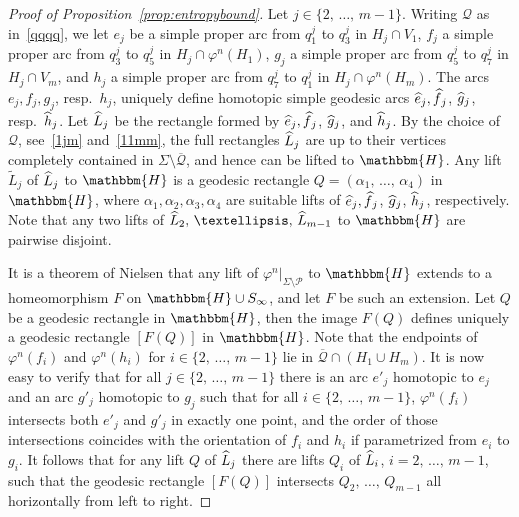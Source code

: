 \documentclass[10pt,a4paper]{amsart}
\numberwithin{equation}{section}
\newcommand{\Hy}{\mathbbm{H}}
\newcommand{\clP}{\mathcal{P}}
\newcommand{\clQ}{\mathcal{Q}}
\let\oldhat\hat
\renewcommand*{\hat}[1]{\mathchoice{\widehat{#1}}{\widehat{#1}}{\oldhat{#1}}{\oldhat{#1}}}
\theoremstyle{definition}
\theoremstyle{remark}
\begin{document}
\begin{proof}[Proof of Proposition~\ref{prop:entropybound}]
Let $j \in \{2,\,\ldots,\,m-1\}$. Writing $\clQ$ as in~\eqref{qqqq}, we let $e_j$ be a simple proper arc from $q_1^j$ to $q_3^j$ in $H_j \cap V_1$, $f_j$ a simple proper arc from $q_3^j$ to $q_5^j$ in $H_j \cap \varphi^n(H_1)$, $g_j$ a simple proper arc from $q_5^j$ to $q_7^j$ in $ H_j\cap V_m$, and $h_j$ a simple proper arc from $q_7^j$ to $q_1^j$ in $H_j \cap \varphi^n(H_m)$. The arcs $e_j, f_j, g_j$, resp.\ $h_j$, uniquely define homotopic simple geodesic arcs $\hat{e}_j, \hat{f}_j$, $\hat{g}_j$, resp.\ $\hat{h}_j$. Let $\hat{L}_j$ be the rectangle formed by $\hat{e}_j, \hat{f}_j$, $\hat{g}_j$, and $\hat{h}_j$. By the choice of $\clQ$, see~\eqref{1jm} and~\eqref{11mm}, the full rectangles $\hat{L}_j$ are up to their vertices completely contained in $\Sigma \setminus \overline{\clQ}$, and hence can be lifted to $\Hy$. Any lift $\widetilde{L}_j$ of $\hat{L}_j$ to $\Hy$ is a geodesic rectangle $Q=(\alpha_1,\, \ldots,\, \alpha_4)$ in $\Hy$, where $\alpha_1, \alpha_2, \alpha_3, \alpha_4$ are suitable lifts of $\hat{e}_j, \hat{f}_j$, $\hat{g}_j$, $\hat{h}_j$, respectively. Note that any two lifts of $\hat{L}_2,\,\ldots,\, \hat{L}_{m-1}$ to $\Hy$ are pairwise disjoint.


It is a theorem of Nielsen that any lift of $\varphi^n|_{\Sigma \setminus \clP}$ to $\Hy$ extends to a homeomorphism $F$ on $\Hy \cup S_{\infty}$, and let $F$ be such an extension. Let $Q$ be a geodesic rectangle in $\Hy$, then the image $F(Q)$ defines uniquely a geodesic rectangle $[F(Q)]$ in $\Hy$. Note that the endpoints of $\varphi^{n}(f_i)$ and $\varphi^{n}(h_i)$ for $i\in \{2, \,\ldots,\, m-1\}$ lie in $\overline{\clQ} \cap (H_1 \cup H_{m})$. It is now easy to verify that for all $j\in\{2, \,\ldots,\, m-1\}$ there is an arc $e'_j$ homotopic to $e_j$ and an arc $g'_j$ homotopic to $g_j$ such that for all $i\in \{2, \,\ldots,\, m-1\}$, $\varphi^n(f_i)$ intersects both $e'_j$ and $g'_j$ in exactly one point, and the order of those intersections coincides with the orientation of $f_i$ and $h_i$ if parametrized from $e_i$ to $g_i$. It follows that for any lift $Q$ of $\hat{L}_j$ there are lifts $Q_i$ of $\hat{L}_i$, $i=2,\, \ldots,\, m-1$, such that the geodesic rectangle $[F(Q)]$ intersects $Q_2, \,\ldots,\, Q_{m-1}$ all horizontally from left to right.


\end{proof}
\end{document}
